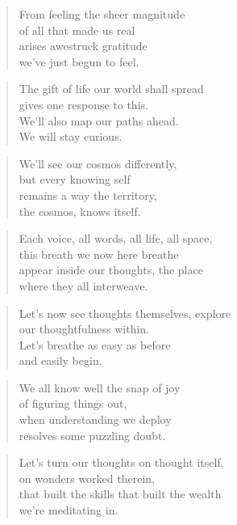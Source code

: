 \documentclass[14pt,a4paper]{article}
\begin{document}
\begin{verse}
From feeling the sheer magnitude\\
of all that made us real\\
arises awestruck gratitude\\
we’ve just begun to feel.
\end{verse}

\begin{verse}
The gift of life our world shall spread\\
gives one response to this.\\
We’ll also map our paths ahead.\\
We will stay curious.
\end{verse}

\begin{verse}
We’ll see our cosmos differently,\\
but every knowing self\\
remains a way the territory,\\
the cosmos, knows itself.
\end{verse}


\begin{verse}
Each voice, all words, all life, all space,\\
this breath we now here breathe\\
appear inside our thoughts, the place\\
where they all interweave.
\end{verse}

\begin{verse}
Let’s now see thoughts themselves, explore\\
our thoughtfulness within.\\
Let’s breathe as easy as before\\
and easily begin.
\end{verse}

\begin{verse}
We all know well the snap of joy\\
of figuring things out,\\
when understanding we deploy\\
resolves some puzzling doubt.
\end{verse}

\begin{verse}
Let’s turn our thoughts on thought itself,\\
on wonders worked therein,\\
that built the skills that built the wealth\\
we’re meditating in.
\end{verse}
\end{document}
